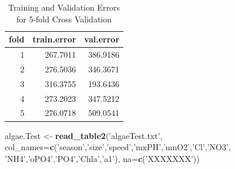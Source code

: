 \documentclass[]{article}
\newenvironment{Shaded}{\begin{snugshade}}{\end{snugshade}}
\newcommand{\KeywordTok}[1]{\textcolor[rgb]{0.13,0.29,0.53}{\textbf{#1}}}
\newcommand{\DataTypeTok}[1]{\textcolor[rgb]{0.13,0.29,0.53}{#1}}
\newcommand{\DecValTok}[1]{\textcolor[rgb]{0.00,0.00,0.81}{#1}}
\newcommand{\StringTok}[1]{\textcolor[rgb]{0.31,0.60,0.02}{#1}}
\newcommand{\OtherTok}[1]{\textcolor[rgb]{0.56,0.35,0.01}{#1}}
\newcommand{\OperatorTok}[1]{\textcolor[rgb]{0.81,0.36,0.00}{\textbf{#1}}}
\newcommand{\NormalTok}[1]{#1}
\begin{document}
\begin{Shaded}
\end{Shaded}

\begin{table}

\caption{\label{tab:unnamed-chunk-9}Training and Validation Errors for 5-fold Cross Validation}
\centering
\begin{tabular}[t]{rrr}
\toprule
fold & train.error & val.error\\
\midrule
1 & 267.7011 & 386.9186\\
2 & 276.5036 & 346.3671\\
3 & 316.3755 & 193.6436\\
4 & 273.2023 & 347.5212\\
5 & 276.0718 & 509.0541\\
\bottomrule
\end{tabular}
\end{table}

\begin{Shaded}
\begin{Highlighting}[]
\NormalTok{algae.Test <-}\StringTok{ }\KeywordTok{read_table2}\NormalTok{(}\StringTok{'algaeTest.txt'}\NormalTok{,}
\DataTypeTok{col_names=}\KeywordTok{c}\NormalTok{(}\StringTok{'season'}\NormalTok{,}\StringTok{'size'}\NormalTok{,}\StringTok{'speed'}\NormalTok{,}\StringTok{'mxPH'}\NormalTok{,}\StringTok{'mnO2'}\NormalTok{,}\StringTok{'Cl'}\NormalTok{,}\StringTok{'NO3'}\NormalTok{,}
\StringTok{'NH4'}\NormalTok{,}\StringTok{'oPO4'}\NormalTok{,}\StringTok{'PO4'}\NormalTok{,}\StringTok{'Chla'}\NormalTok{,}\StringTok{'a1'}\NormalTok{),}
\DataTypeTok{na=}\KeywordTok{c}\NormalTok{(}\StringTok{'XXXXXXX'}\NormalTok{))}
\end{Highlighting}
\end{Shaded}
\end{document}
